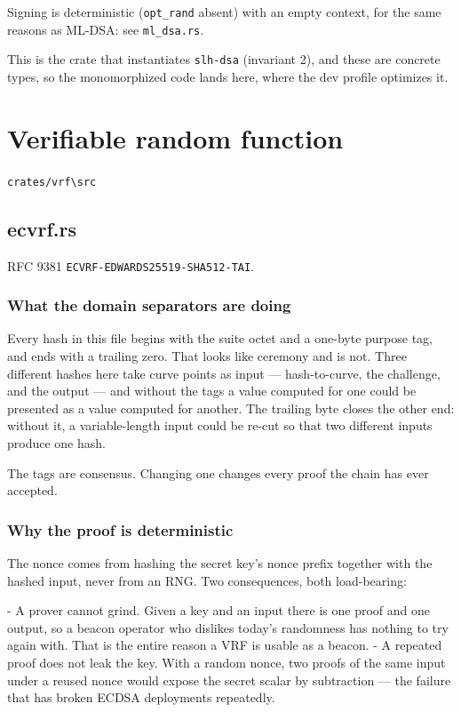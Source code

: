 \documentclass[11pt,a4paper]{article}
\begin{document}
Signing is deterministic (\texttt{opt\_rand} absent) with an empty context, for
the same reasons as ML-DSA: see \texttt{ml\_dsa.rs}.

This is the crate that instantiates \texttt{slh-dsa} (invariant 2), and these are
concrete types, so the monomorphized code lands here, where the dev
profile optimizes it.

\section{Verifiable random function}
\noindent\texttt{crates/vrf\textbackslash{}src}

\subsection{ecvrf.rs}
RFC 9381 \texttt{ECVRF-EDWARDS25519-SHA512-TAI}.

\subsubsection{What the domain separators are doing}

Every hash in this file begins with the suite octet and a one-byte purpose
tag, and ends with a trailing zero. That looks like ceremony and is not.
Three different hashes here take curve points as input — hash-to-curve, the
challenge, and the output — and without the tags a value computed for one
could be presented as a value computed for another. The trailing byte closes
the other end: without it, a variable-length input could be re-cut so that
two different inputs produce one hash.

The tags are consensus. Changing one changes every proof the chain has ever
accepted.

\subsubsection{Why the proof is deterministic}

The nonce comes from hashing the secret key's nonce prefix together with the
hashed input, never from an RNG. Two consequences, both load-bearing:

- A prover cannot grind. Given a key and an input there is one proof and one
  output, so a beacon operator who dislikes today's randomness has nothing
  to try again with. That is the entire reason a VRF is usable as a beacon.
- A repeated proof does not leak the key. With a random nonce, two proofs of
  the same input under a reused nonce would expose the secret scalar by
  subtraction — the failure that has broken ECDSA deployments repeatedly.
\end{document}
